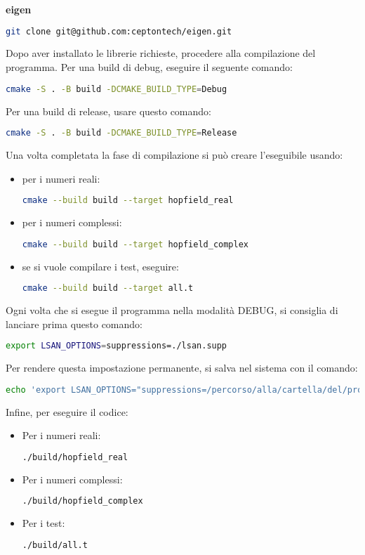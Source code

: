 \documentclass{article}
\begin{document}
\textbf{eigen}
\begin{lstlisting}[language=bash]
git clone git@github.com:ceptontech/eigen.git
\end{lstlisting}

Dopo aver installato le librerie richieste,  procedere alla compilazione del programma. Per una build di debug, eseguire il seguente comando:

\begin{lstlisting}[language=bash]
cmake -S . -B build -DCMAKE_BUILD_TYPE=Debug
\end{lstlisting}

Per una build di release, usare questo comando:
\begin{lstlisting}[language=bash]
cmake -S . -B build -DCMAKE_BUILD_TYPE=Release
\end{lstlisting}

Una volta completata la fase di compilazione si può creare l'eseguibile usando: 
\\
\begin{itemize}
    \item per i numeri reali:
\begin{lstlisting}[language=bash]
cmake --build build --target hopfield_real
\end{lstlisting}
\item per i numeri complessi:
\begin{lstlisting}[language=bash]
cmake --build build --target hopfield_complex
\end{lstlisting}
\item se si vuole compilare i test, eseguire:
\begin{lstlisting}[language=bash]
cmake --build build --target all.t
\end{lstlisting}
\end{itemize}




Ogni volta che si esegue il programma nella modalità DEBUG, si consiglia di lanciare prima questo comando:
\begin{lstlisting}[language=bash]
export LSAN_OPTIONS=suppressions=./lsan.supp
\end{lstlisting}
Per rendere questa impostazione permanente, si salva nel sistema con il comando:
\begin{lstlisting}[language=bash]
echo 'export LSAN_OPTIONS="suppressions=/percorso/alla/cartella/del/progetto/lsan.supp"' >> ~/.bashrc
\end{lstlisting}
Infine, per eseguire il codice: 
\begin{itemize}
    \item Per i numeri reali:
\begin{lstlisting}[language=bash]
./build/hopfield_real
\end{lstlisting}
\item Per i numeri complessi:
\begin{lstlisting}[language=bash]
./build/hopfield_complex
\end{lstlisting}
\item Per i test:
\begin{lstlisting}[language=bash]
./build/all.t
\end{lstlisting}
\end{itemize}
\end{document}
